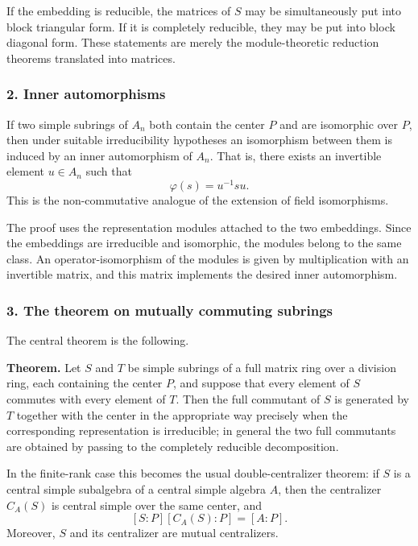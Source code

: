 \documentclass[11pt]{article}
\begin{document}
If the embedding is reducible, the matrices of \(S\) may be
simultaneously put into block triangular form. If it is completely
reducible, they may be put into block diagonal form. These statements
are merely the module-theoretic reduction theorems translated into
matrices.

\subsubsection{2. Inner automorphisms}\label{inner-automorphisms}

If two simple subrings of \(A_n\) both contain the center \(P\) and are
isomorphic over \(P\), then under suitable irreducibility hypotheses an
isomorphism between them is induced by an inner automorphism of \(A_n\).
That is, there exists an invertible element \(u\in A_n\) such that \[
  \varphi(s)=u^{-1}su.
\] This is the non-commutative analogue of the extension of field
isomorphisms.

The proof uses the representation modules attached to the two
embeddings. Since the embeddings are irreducible and isomorphic, the
modules belong to the same class. An operator-isomorphism of the modules
is given by multiplication with an invertible matrix, and this matrix
implements the desired inner automorphism.

\subsubsection{3. The theorem on mutually commuting
subrings}\label{the-theorem-on-mutually-commuting-subrings}

The central theorem is the following.

\textbf{Theorem.} Let \(S\) and \(T\) be simple subrings of a full
matrix ring over a division ring, each containing the center \(P\), and
suppose that every element of \(S\) commutes with every element of
\(T\). Then the full commutant of \(S\) is generated by \(T\) together
with the center in the appropriate way precisely when the corresponding
representation is irreducible; in general the two full commutants are
obtained by passing to the completely reducible decomposition.

In the finite-rank case this becomes the usual double-centralizer
theorem: if \(S\) is a central simple subalgebra of a central simple
algebra \(A\), then the centralizer \(C_A(S)\) is central simple over
the same center, and \[
  [S:P]
  [C_A(S):P]
  =[A:P].
\] Moreover, \(S\) and its centralizer are mutual centralizers.
\end{document}
